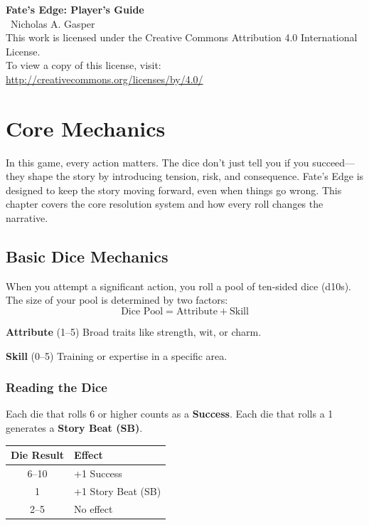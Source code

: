 \documentclass[11pt,twoside,openany]{book}
\begin{document}
\thispagestyle{empty}
\begin{center}
\textbf{Fate's Edge: Player's Guide}\\
\textcopyright\ Nicholas A. Gasper\\[1em]

This work is licensed under the Creative Commons Attribution 4.0 International License.\\
To view a copy of this license, visit:\\
\url{http://creativecommons.org/licenses/by/4.0/}
\end{center}

\tableofcontents



\chapter{Core Mechanics} \label{ch:core}

In this game, every action matters. The dice don't just tell you if you succeed---they shape the story by introducing tension, risk, and consequence. Fate's Edge is designed to keep the story moving forward, even when things go wrong. This chapter covers the core resolution system and how every roll changes the narrative.

\section*{Basic Dice Mechanics} 

When you attempt a significant action, you roll a pool of ten-sided dice (d10s). The size of your pool is determined by two factors:
$$\text{Dice Pool} = \text{Attribute} + \text{Skill}$$

\textbf{Attribute} (1--5) Broad traits like strength, wit, or charm.

\textbf{Skill} (0--5) Training or expertise in a specific area.

\subsection*{Reading the Dice}

Each die that rolls 6 or higher counts as a \textbf{Success}. Each die that rolls a 1 generates a \textbf{Story Beat (SB)}.

\begin{center}
\begin{tabular}{|c|l|}
\hline
\textbf{Die Result} & \textbf{Effect} \\
\hline
6--10 & +1 Success \\
1 & +1 Story Beat (SB) \\
2--5 & No effect \\
\hline
\end{tabular}
\end{center}
\end{document}
